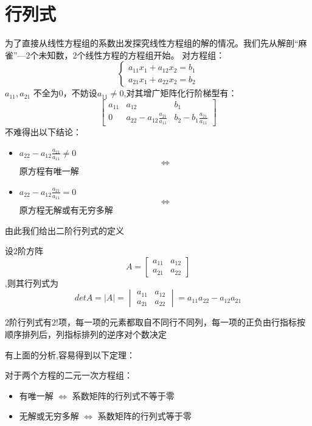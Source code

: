 \chapter{行列式}
为了直接从线性方程组的系数出发探究线性方程组的解的情况。我们先从解剖“麻雀”---2个未知数，2个线性方程的方程组开始。
对方程组：
\begin{equation*}
    \begin{cases}
        a_{11}x_1 + a_{12}x_2 = b_1\\
         a_{21}x_1 + a_{22}x_2 = b_2
     \end{cases}
\end{equation*}
\(a_{11},a_{21}\) 不全为0，不妨设$a_{11} \neq 0$,对其增广矩阵化行阶梯型有：
\begin{equation*}
    \begin{bmatrix}
        a_{11} & a_{12} & b_{1} \\
        0   &   a_{22}-a_{12}\frac{a_{21}}{a_{11}}  &   b_{2}-b_{1}\frac{a_{21}}{a_{11}}
    \end{bmatrix}
\end{equation*}
不难得出以下结论：
\begin{itemize}
    \item $a_{22}-a_{12}\frac{a_{21}}{a_{11}} \neq 0$ $$\Longleftrightarrow$$ 原方程有唯一解
    \item $a_{22}-a_{12}\frac{a_{21}}{a_{11}} = 0$ $$\Longleftrightarrow$$ 原方程无解或有无穷多解
\end{itemize}
由此我们给出二阶行列式的定义
\begin{definition}
    设$2$阶方阵
    \begin{equation*}
        A = \begin{bmatrix}
            a_{11} & a_{12}\\
            a_{21} & a_{22}
        \end{bmatrix}
    \end{equation*}
    ,则其行列式为
    \begin{equation*}
        det A=|A| = \begin{vmatrix}
            a_{11} & a_{12}\\
            a_{21} & a_{22}
        \end{vmatrix}
        = a_{11}a_{22} - a_{12}a_{21}
    \end{equation*}
\end{definition}
\begin{remark}
    $2$阶行列式有$2!$项，每一项的元素都取自不同行不同列，每一项的正负由行指标按顺序排列后，列指标排列的逆序对个数决定
\end{remark}
有上面的分析,容易得到以下定理：
\begin{theorem}
    对于两个方程的二元一次方程组：
    \begin{itemize}
        \item 有唯一解 $\Leftrightarrow$ 系数矩阵的行列式不等于零
        \item 无解或无穷多解 $\Leftrightarrow$ 系数矩阵的行列式等于零
    \end{itemize}
\end{theorem}

